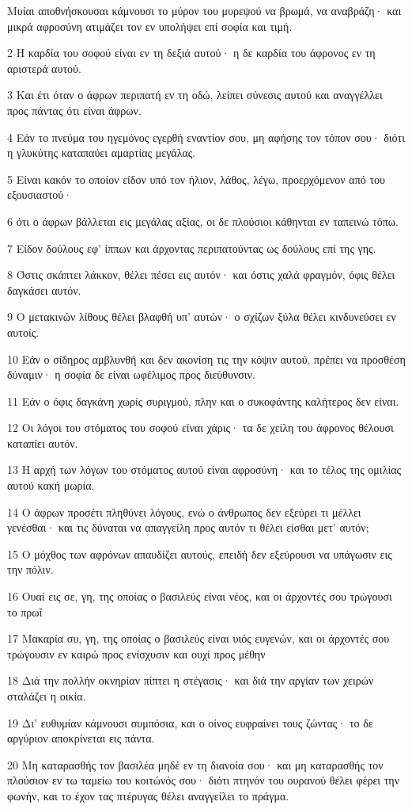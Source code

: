 \par Μυίαι αποθνήσκουσαι κάμνουσι το μύρον του μυρεψού να βρωμά, να αναβράζη· και μικρά αφροσύνη ατιμάζει τον εν υπολήψει επί σοφία και τιμή.
\par 2 Η καρδία του σοφού είναι εν τη δεξιά αυτού· η δε καρδία του άφρονος εν τη αριστερά αυτού.
\par 3 Και έτι όταν ο άφρων περιπατή εν τη οδώ, λείπει σύνεσις αυτού και αναγγέλλει προς πάντας ότι είναι άφρων.
\par 4 Εάν το πνεύμα του ηγεμόνος εγερθή εναντίον σου, μη αφήσης τον τόπον σου· διότι η γλυκύτης καταπαύει αμαρτίας μεγάλας.
\par 5 Είναι κακόν το οποίον είδον υπό τον ήλιον, λάθος, λέγω, προερχόμενον από του εξουσιαστού·
\par 6 ότι ο άφρων βάλλεται εις μεγάλας αξίας, οι δε πλούσιοι κάθηνται εν ταπεινώ τόπω.
\par 7 Είδον δούλους εφ' ίππων και άρχοντας περιπατούντας ως δούλους επί της γης.
\par 8 Όστις σκάπτει λάκκον, θέλει πέσει εις αυτόν· και όστις χαλά φραγμόν, όφις θέλει δαγκάσει αυτόν.
\par 9 Ο μετακινών λίθους θέλει βλαφθή υπ' αυτών· ο σχίζων ξύλα θέλει κινδυνεύσει εν αυτοίς.
\par 10 Εάν ο σίδηρος αμβλυνθή και δεν ακονίση τις την κόψιν αυτού, πρέπει να προσθέση δύναμιν· η σοφία δε είναι ωφέλιμος προς διεύθυνσιν.
\par 11 Εάν ο όφις δαγκάνη χωρίς συριγμού, πλην και ο συκοφάντης καλήτερος δεν είναι.
\par 12 Οι λόγοι του στόματος του σοφού είναι χάρις· τα δε χείλη του άφρονος θέλουσι καταπίει αυτόν.
\par 13 Η αρχή των λόγων του στόματος αυτού είναι αφροσύνη· και το τέλος της ομιλίας αυτού κακή μωρία.
\par 14 Ο άφρων προσέτι πληθύνει λόγους, ενώ ο άνθρωπος δεν εξεύρει τι μέλλει γενέσθαι· και τις δύναται να απαγγείλη προς αυτόν τι θέλει είσθαι μετ' αυτόν;
\par 15 Ο μόχθος των αφρόνων απαυδίζει αυτούς, επειδή δεν εξεύρουσι να υπάγωσιν εις την πόλιν.
\par 16 Ουαί εις σε, γη, της οποίας ο βασιλεύς είναι νέος, και οι άρχοντές σου τρώγουσι το πρωΐ
\par 17 Μακαρία συ, γη, της οποίας ο βασιλεύς είναι υιός ευγενών, και οι άρχοντές σου τρώγουσιν εν καιρώ προς ενίσχυσιν και ουχί προς μέθην
\par 18 Διά την πολλήν οκνηρίαν πίπτει η στέγασις· και διά την αργίαν των χειρών σταλάζει η οικία.
\par 19 Δι' ευθυμίαν κάμνουσι συμπόσια, και ο οίνος ευφραίνει τους ζώντας· το δε αργύριον αποκρίνεται εις πάντα.
\par 20 Μη καταρασθής τον βασιλέα μηδέ εν τη διανοία σου· και μη καταρασθής τον πλούσιον εν τω ταμείω του κοιτώνός σου· διότι πτηνόν του ουρανού θέλει φέρει την φωνήν, και το έχον τας πτέρυγας θέλει αναγγείλει το πράγμα.


